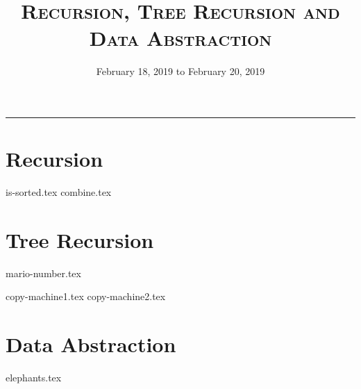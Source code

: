 \documentclass{exam}
\title{\textsc{Recursion, Tree Recursion and Data Abstraction}}
\date{February 18, 2019 to February 20, 2019}
\begin{document}
\maketitle
\rule{\textwidth}{0.15em}
\fontsize{12}{15}\selectfont


\section{Recursion}
\begin{questions}
{is-sorted.tex}
{combine.tex}
\end{questions}

\section{Tree Recursion}
\begin{questions}
{mario-number.tex}

{copy-machine1.tex}
{copy-machine2.tex}
\end{questions}


\section{Data Abstraction}
\begin{questions}
{elephants.tex}
\end{questions}
\end{document}

